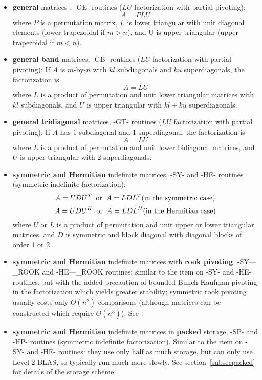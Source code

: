 \begin{itemize}

\item {\bf general} matrices , -GE- routines ($LU$ factorization with partial pivoting):
\[ A = PLU \]
where $P$ is a permutation matrix, $L$ is lower triangular with unit
diagonal elements (lower trapezoidal if $m > n$), and U is upper
triangular (upper trapezoidal if $m < n$).

\item {\bf general band} matrices, -GB- routines ($LU$ factorization with partial pivoting):
If $A$ is $m$-by-$n$ with $kl$ subdiagonals and $ku$ superdiagonals,
the factorization is
\[ A = LU \]
where $L$ is a product of permutation and unit lower triangular
matrices with $kl$ subdiagonals, and $U$ is upper triangular with
$kl+ku$ superdiagonals.

\item {\bf general tridiagonal} matrices, -GT- routines ($LU$ factorization with partial pivoting):
If $A$ has 1 subdiagonal and 1 superdiagonal, the factorization is
\[ A = LU \]
where $L$ is a product of permutation and unit lower bidiagonal matrices,
and $U$ is upper triangular with 2 superdiagonals.

\item {\bf symmetric and Hermitian} indefinite matrices, -SY- and -HE- routines (symmetric indefinite
factorization):
\[ A = U D U^T \; \; {\rm or} \; \; A = L D L^T \mbox{(in the symmetric case)}\]
\[ A = U D U^H \; \; {\rm or} \; \; A = L D L^H \mbox{(in the Hermitian case)}\]
where $U$ or $L$ is a product of permutation and unit upper or lower
triangular matrices, and $D$ is symmetric and block diagonal with diagonal
blocks of order 1 or 2.

\item {\bf symmetric and Hermitian} indefinite matrices with {\bf rook pivoting}, -SY---\_ROOK
and -HE---\_ROOK routines:
similar to the item on -SY- and -HE- routines, but with the added precaution of bounded Bunch-Kaufman pivoting in the
factorization which yields greater stability;
symmetric rook pivoting usually costs only $O(n^{2})$ comparisons
(although matrices can be constructed which require $O(n^{3})$).
See \cite{ashcraftetal98,higham02}.
 
\item {\bf symmetric and Hermitian} indefinite matrices in {\bf packed} storage, -SP- and -HP- routines
(symmetric indefinite factorization).
Similar to the item on -SY- and -HE- routines: they use only half as much storage, but can only use Level 2 BLAS,
so typically run much more slowly.
See section~\ref{subsecpacked} for details of the storage scheme.


\end{itemize}

